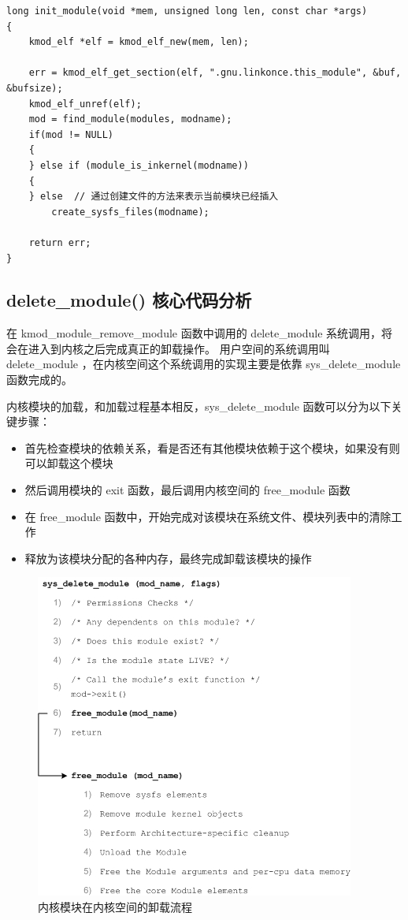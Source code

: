{\begin{shaded}\begin{verbatim}
long init_module(void *mem, unsigned long len, const char *args)
{
    kmod_elf *elf = kmod_elf_new(mem, len);

    err = kmod_elf_get_section(elf, ".gnu.linkonce.this_module", &buf, &bufsize);
    kmod_elf_unref(elf);
    mod = find_module(modules, modname);
    if(mod != NULL)
    { 
    } else if (module_is_inkernel(modname))
    {
    } else  // 通过创建文件的方法来表示当前模块已经插入
        create_sysfs_files(modname);

    return err;
}
\end{verbatim}\end{shaded}}
\subsection{delete\_module() 核心代码分析}

在 kmod\_module\_remove\_module 函数中调用的 delete\_module
系统调用，将会在进入到内核之后完成真正的卸载操作。 用户空间的系统调用叫
delete\_module ，在内核空间这个系统调用的实现主要是依靠
sys\_delete\_module 函数完成的。

内核模块的加载，和加载过程基本相反，sys\_delete\_module
函数可以分为以下关键步骤：

\begin{itemize}
\item
  首先检查模块的依赖关系，看是否还有其他模块依赖于这个模块，如果没有则可以卸载这个模块
\item
  然后调用模块的 exit 函数，最后调用内核空间的 free\_module 函数
\item
  在 free\_module
  函数中，开始完成对该模块在系统文件、模块列表中的清除工作
\item
  释放为该模块分配的各种内存，最终完成卸载该模块的操作
\end{itemize}
\begin{figure}[htbp]
\centering
\includegraphics{./figures/sys_delete_module.jpg}
\caption{内核模块在内核空间的卸载流程}
\end{figure}

